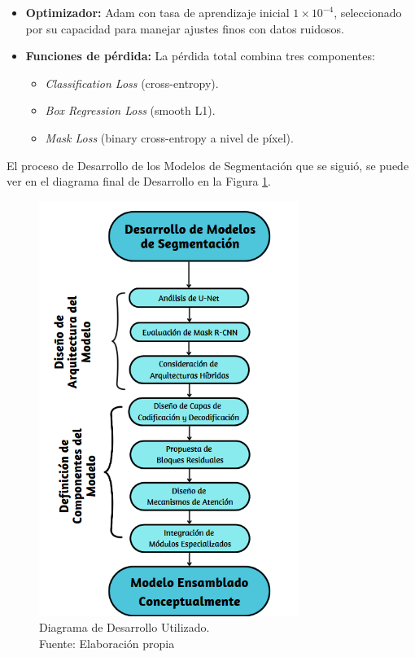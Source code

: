 \begin{enumerate}
\begin{itemize}
\begin{itemize}
    \item \textbf{Optimizador:} Adam con tasa de aprendizaje inicial $1 \times 10^{-4}$, seleccionado por su capacidad para manejar ajustes finos con datos ruidosos.
    
    \item \textbf{Funciones de pérdida:} La pérdida total combina tres componentes: 
    \begin{itemize}
        \item \textit{Classification Loss} (cross-entropy).
        \item \textit{Box Regression Loss} (smooth L1).
        \item \textit{Mask Loss} (binary cross-entropy a nivel de píxel).
    \end{itemize}
\end{itemize}

  \end{itemize}
\end{enumerate}


El proceso de Desarrollo de los Modelos de Segmentación que se siguió, se puede ver en el diagrama final de Desarrollo en la Figura \ref{4:figdesfin}.
\begin{figure}[h]
	\begin{center}
		\includegraphics[width=0.75\textwidth]{4/figures/Diagrama de desarrollo.png}
		\caption[Diagrama de Desarrollo Utilizado]{Diagrama de Desarrollo Utilizado.\\
		Fuente: Elaboración propia}
		\label{4:figdesfin}
	\end{center}
\end{figure}
\clearpage
\newpage

